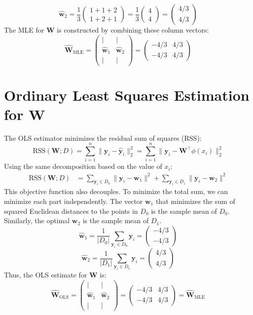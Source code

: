 \documentclass[11pt, a4paper, oneside]{memoir}
\begin{document}
\[ \hat{\mathbf{w}}_2 = \frac{1}{3} \begin{pmatrix} 1+1+2 \\ 1+2+1 \end{pmatrix} = \frac{1}{3} \begin{pmatrix} 4 \\ 4 \end{pmatrix} = \begin{pmatrix} 4/3 \\ 4/3 \end{pmatrix} \]
The MLE for $\mathbf{W}$ is constructed by combining these column vectors:
\[ \hat{\mathbf{W}}_{\text{MLE}} = \begin{pmatrix} | & | \\ \hat{\mathbf{w}}_1 & \hat{\mathbf{w}}_2 \\ | & | \end{pmatrix} = \begin{pmatrix} -4/3 & 4/3 \\ -4/3 & 4/3 \end{pmatrix} \]

\section[Ordinary Least Squares Estimation for W]{Ordinary Least Squares Estimation for $\mathbf{W}$}
The OLS estimator minimizes the residual sum of squares (RSS):
\[ \text{RSS}(\mathbf{W} ; D) = \sum_{i=1}^n \| \mathbf{y}_i - \hat{\mathbf{y}}_i \|_2^2 = \sum_{i=1}^n \| \mathbf{y}_i - \mathbf{W}^\top\phi(x_i) \|_2^2 \]
Using the same decomposition based on the value of $x_i$:
\begin{align*}
    \text{RSS}(\mathbf{W} ; D) & = \sum_{\mathbf{y}_i \in D_0} \| \mathbf{y}_i - \mathbf{w}_1 \|^2 + \sum_{\mathbf{y}_i \in D_1} \| \mathbf{y}_i - \mathbf{w}_2 \|^2
\end{align*}
This objective function also decouples. To minimize the total sum, we can minimize each part independently. The vector $\mathbf{w}_1$ that minimizes the sum of squared Euclidean distances to the points in $D_0$ is the sample mean of $D_0$. Similarly, the optimal $\mathbf{w}_2$ is the sample mean of $D_1$.
\[ \hat{\mathbf{w}}_1 = \frac{1}{|D_0|} \sum_{\mathbf{y}_i \in D_0} \mathbf{y}_i = \begin{pmatrix} -4/3 \\ -4/3 \end{pmatrix} \]
\[ \hat{\mathbf{w}}_2 = \frac{1}{|D_1|} \sum_{\mathbf{y}_i \in D_1} \mathbf{y}_i = \begin{pmatrix} 4/3 \\ 4/3 \end{pmatrix} \]
Thus, the OLS estimate for $\mathbf{W}$ is:
\[ \hat{\mathbf{W}}_{\text{OLS}} = \begin{pmatrix} | & | \\ \hat{\mathbf{w}}_1 & \hat{\mathbf{w}}_2 \\ | & | \end{pmatrix} = \begin{pmatrix} -4/3 & 4/3 \\ -4/3 & 4/3 \end{pmatrix} = \hat{\mathbf{W}}_{\text{MLE}} \]
\end{document}
